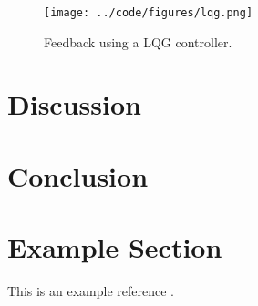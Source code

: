\documentclass[a4paper, titlepage]{article}
\begin{document}
\begin{figure}[h!]
\center
\texttt{[image: ../code/figures/lqg.png]}
\caption{Feedback using a LQG controller.}
\label{fig:lqgControl}
\end{figure}


\section{Discussion}



\section{Conclusion}

\clearpage


\clearpage
\appendix

\section{Example Section}
This is an example reference \citep{glad00}.



\end{document}
